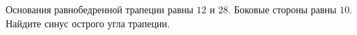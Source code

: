 \begin{ex}
	\begin{condition}
		Основания равнобедренной трапеции равны \( 12  \) и \( 28 \). Боковые стороны равны \( 10 \). Найдите синус острого угла трапеции.
	\end{condition}
\end{ex}